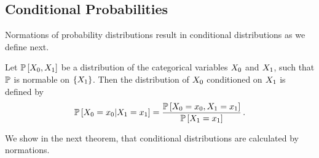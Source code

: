 \subsection{Conditional Probabilities}

Normations of probability distributions result in conditional distributions as we define next.

\begin{definition}\label{def:conditionalProbability}
	Let $\mathbb{P}\left[X_{0},X_{1}\right]$ be a distribution of the categorical variables $X_{0}$ and $X_{1}$, such that $\mathbb{P}$ is normable on $\{X_{1}\}$.
	Then the distribution of $X_{0}$ conditioned on $X_{1}$ is defined by
		\[ \mathbb{P}\left[X_{0}=x_{0}|X_{1}=x_{1}\right]  
		= \frac{\mathbb{P}\left[X_{0}=x_{0},X_{1}=x_{1}\right]}{\mathbb{P}\left[X_{1}=x_{1}\right]} \, . \]
\end{definition}

%	

We show in the next theorem, that conditional distributions are calculated by normations.

